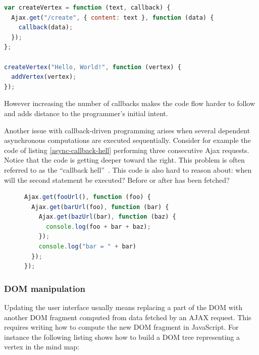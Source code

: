 \documentclass[american,english,runningheads]{llncs}
\begin{document}
\begin{lstlisting}[language=JavaScript,label=async-js,caption=Callback-driven JavaScript APIs]
var createVertex = function (text, callback) {
  Ajax.get("/create", { content: text }, function (data) {
    callback(data);
  });
};

createVertex("Hello, World!", function (vertex) {
  addVertex(vertex);
});
\end{lstlisting}

However increasing the number of callbacks makes the code flow harder to follow and adds distance to the programmer's
initial intent.

Another issue with callback-driven programming arises when several dependent asynchronous computations are executed
sequentially. Consider for example the code of listing \ref{async-callback-hell} performing three consecutive Ajax
requests. Notice that the code is getting deeper toward the right. This problem is often referred to as the
“callback hell”~\cite{McKenna_Roy}. This code is also hard to reason about: when will the second 
statement be executed? Before or after  has been fetched?

\begin{figure}
\begin{lstlisting}[language=JavaScript,label=async-callback-hell,caption=Sequential asynchronous calls]
Ajax.get(fooUrl(), function (foo) {
  Ajax.get(barUrl(foo), function (bar) {
    Ajax.get(bazUrl(bar), function (baz) {
      console.log(foo + bar + baz);
    });
    console.log("bar = " + bar)
  });
});
\end{lstlisting}
\end{figure}

\subsubsection{DOM manipulation}
\label{forest}

Updating the user interface usually means replacing a part of the DOM with another DOM fragment computed from data
fetched by an AJAX request. This requires writing how to compute the new DOM fragment in JavaScript. For instance
the following listing shows how to build a DOM tree representing a vertex in the mind map:
\end{document}
